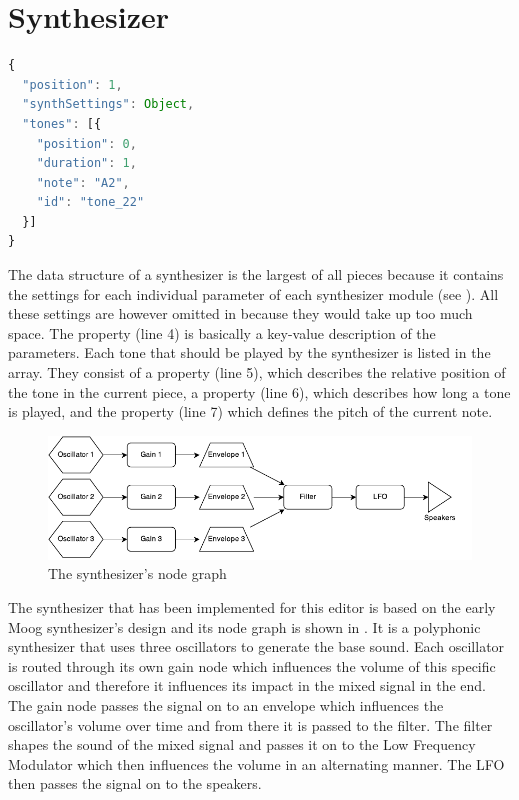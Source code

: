 \section{Synthesizer}
\label{impl-synth}

\begin{lstlisting}[language=JavaScript, caption=A synthesizer's data structure, label=lst:synth]
{
  "position": 1,
  "synthSettings": Object,
  "tones": [{
    "position": 0,
    "duration": 1,
    "note": "A2",
    "id": "tone_22"
  }]
}
\end{lstlisting}

The data structure of a synthesizer is the largest of all pieces because it contains the settings for each individual parameter of each synthesizer module (see ). All these settings are however omitted in  because they would take up too much space. The  property (line 4) is basically a key-value description of the parameters. Each tone that should be played by the synthesizer is listed in the  array. They consist of a  property (line 5), which describes the relative position of the tone in the current piece, a   property (line 6), which describes how long a tone is played, and the  property (line 7) which defines the pitch of the current note.

\medskip
\begin{figure}[htb]
  \centerline{\includegraphics[width=\linewidth]{images/SynthesizerNodeGraph.pdf}}
  \caption[The synthesizer's node graph]{The synthesizer's node graph}
  \label{fig:synth-node-graph}
\end{figure}

The synthesizer that has been implemented for this editor is based on the early Moog synthesizer's design and its node graph is shown in . It is a polyphonic synthesizer that uses three oscillators to generate the base sound. Each oscillator is routed through its own gain node which influences the volume of this specific oscillator and therefore it influences its impact in the mixed signal in the end. The gain node passes the signal on to an envelope which influences the oscillator's volume over time and from there it is passed to the filter. The filter shapes the sound of the mixed signal and passes it on to the Low Frequency Modulator which then influences the volume in an alternating manner. The LFO then passes the signal on to the speakers.

